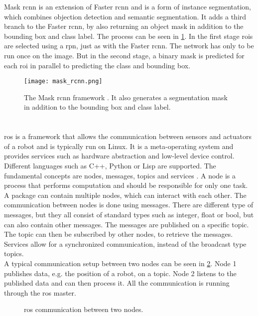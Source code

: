 Mask \gls{rcnn} \cite{He2017} is an extension of Faster \gls{rcnn} and is a form of instance segmentation, which combines objection detection and semantic segmentation.
It adds a third branch to the Faster \gls{rcnn}, by also returning an object mask in addition to the bounding box and class label.
The process can be seen in \cref{fig:mask_rcnn}.
In the first stage \glspl{roi} are selected using a \gls{rpn}, just as with the Faster \gls{rcnn}.
The network has only to be run once on the image.
But in the second stage, a binary mask is predicted for each \gls{roi} in parallel to predicting the class and bounding box.
\begin{figure}[htbp]
	\centering
	\texttt{[image: mask\_rcnn.png]}
	\caption[Mask \acrshort{rcnn} framework]{The Mask \acrshort{rcnn} framework \cite{He2017}. It also generates a segmentation mask in addition to the bounding box and class label.}
	\label{fig:mask_rcnn}
\end{figure}



\section{}
\label{sec:ros}
\acrfull{ros} is a framework that allows the communication between sensors and actuators of a robot and is typically run on Linux.
It is a meta-operating system and provides services such as hardware abstraction and low-level device control.
Different languages such as C++, Python or Lisp are supported.
The fundamental concepts are nodes, messages, topics and services \cite{Quigley2009}.
A node is a process that performs computation and should be responsible for only one task.
A package can contain multiple nodes, which can interact with each other.
The communication between nodes is done using messages.
There are different type of messages, but they all consist of standard types such as integer, float or bool, but can also contain other messages.
The messages are published on a specific topic.
The topic can then be subscribed by other nodes, to retrieve the messages.
Services allow for a synchronized communication, instead of the broadcast type topics.\\
A typical communication setup between two nodes can be seen in \cref{fig:ros_framework}.
Node 1 publishes data, e.g. the position of a robot, on a topic.
Node 2 listens to the published data and can then process it.
All the communication is running through the \gls{ros} master.
\begin{figure}[htb]
	\centering
	
	\caption[\acrshort{ros} communication]{\acrshort{ros} communication between two nodes.}
	\label{fig:ros_framework}
\end{figure}
